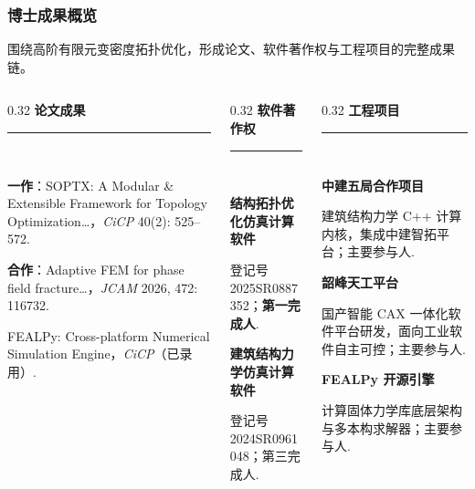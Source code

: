 \documentclass[notheorems]{beamer}
\newcommand{\blocktitle}[1]{%
	{\fontsize{10}{12}\selectfont\bfseries\sffamily\color{structure.fg}#1}\\[3pt]%
	{\color{structure.fg!35}\rule{\linewidth}{0.8pt}}\\[6pt]}
\newcommand{\accentintro}[1]{%
	\noindent{\color{structure.fg}\rule[-2pt]{3pt}{12pt}}\hspace{7pt}%
	\begin{minipage}[t]{\dimexpr\linewidth-13pt\relax}%
		\fontsize{8}{11.5}\selectfont\sffamily #1\end{minipage}\par}
\begin{document}
	\begin{frame}
		\frametitle{博士成果概览}

		\accentintro{围绕高阶有限元变密度拓扑优化，形成论文、软件著作权与工程项目的完整成果链。}

		\vspace{0.9em}

		\begin{columns}[T, totalwidth=\linewidth]

			\begin{column}{0.32\linewidth}
				\blocktitle{\enspace 论文成果}
				{\fontsize{6.6}{9.5}\selectfont\sffamily
					\textbf{一作}：SOPTX: A Modular \& Extensible Framework for Topology Optimization…，\textit{CiCP} 40(2): 525–572.
					\par\vspace{6pt}
					\textbf{合作}：Adaptive FEM for phase field fracture…，\textit{JCAM} 2026, 472: 116732.
					\par\vspace{3pt}
					FEALPy: Cross-platform Numerical Simulation Engine，\textit{CiCP}（已录用）.}
			\end{column}

			\begin{column}{0.32\linewidth}
				\blocktitle{\enspace 软件著作权}
				{\fontsize{6.6}{9.5}\selectfont\sffamily
					\textbf{结构拓扑优化仿真计算软件}\par\vspace{1pt}
					登记号 2025SR0887352；\textbf{第一完成人}.
					\par\vspace{6pt}
					\textbf{建筑结构力学仿真计算软件}\par\vspace{1pt}
					登记号 2024SR0961048；第三完成人.}
			\end{column}

			\begin{column}{0.32\linewidth}
				\blocktitle{\enspace 工程项目}
				{\fontsize{6.6}{9.5}\selectfont\sffamily
					\textbf{中建五局合作项目}\par\vspace{1pt}
					建筑结构力学 C++ 计算内核，集成中建智拓平台；主要参与人.
					\par\vspace{6pt}
					\textbf{韶峰天工平台}\par\vspace{1pt}
					国产智能 CAX 一体化软件平台研发，面向工业软件自主可控；主要参与人.
					\par\vspace{6pt}
					\textbf{FEALPy 开源引擎}\par\vspace{1pt}
					计算固体力学库底层架构与多本构求解器；主要参与人.}
			\end{column}


\end{columns}
\end{frame}
\end{document}
